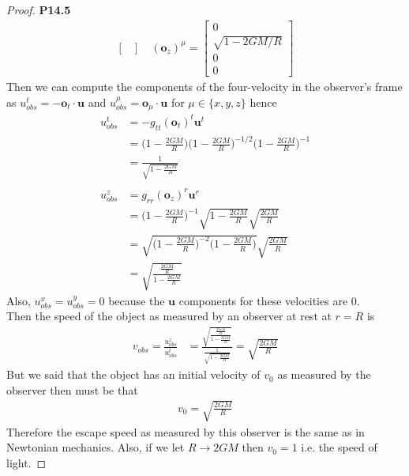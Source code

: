 \documentclass[11pt]{article}
\theoremstyle{definition}
\begin{document}
\begin{proof}{\textbf{P14.5}}
\begin{align*}
\begin{bmatrix}
    \end{bmatrix}
    \quad (\bm{o}_z)^\mu = \begin{bmatrix}
        0\\ \sqrt{1 - 2GM/R}\\ 0 \\ 0
    \end{bmatrix}
\end{align*}
Then we can compute the components of the four-velocity in the observer's frame
as $u_{obs}^t = -\bm{o}_t\cdot \bm{u}$ and $u_{obs}^\mu = \bm{o}_\mu\cdot \bm{u}$
for $\mu \in \{x, y, z\}$ hence
\begin{align*}
    u_{obs}^t &= -g_{tt}(\bm{o}_t)^t \bm{u}^t\\
    &= \bigg(1 - \frac{2GM}{R}\bigg)\bigg(1 - \frac{2GM}{R}\bigg)^{-1/2}
    \bigg(1 - \frac{2GM}{R}\bigg)^{-1}\\
    &= \frac{1}{\sqrt{1 - \frac{2GM}{R}}}\\
    \\
    u_{obs}^z &= g_{rr}(\bm{o}_z)^r \bm{u}^r\\
    &=\bigg(1 - \frac{2GM}{R}\bigg)^{-1}\sqrt{1 - \frac{2GM}{R}}
    \sqrt{\frac{2GM}{R}}\\
    &=\sqrt{\bigg(1 - \frac{2GM}{R}\bigg)^{-2}\bigg(1 - \frac{2GM}{R}\bigg)}
    \sqrt{\frac{2GM}{R}}\\
    &= \sqrt{\frac{\frac{2GM}{R}}{1 - \frac{2GM}{R}}}
\end{align*}
Also, $u_{obs}^x = u_{obs}^y = 0$ because the $\bm{u}$ components for these
velocities are 0.
\\
Then the speed of the object as measured by an observer at rest at $r = R$ is
\begin{align*}
    v_{obs} = \frac{u_{obs}^z}{u_{obs}^t} 
    &= \frac{\sqrt{\frac{\frac{2GM}{R}}{1 - \frac{2GM}{R}}}}
    {\frac{1}{\sqrt{1 - \frac{2GM}{R}}}}
    = \sqrt{\frac{2GM}{R}}
\end{align*}
But we said that the object has an initial velocity of $v_0$ as measured by
the observer then must be that
\begin{align*}
    v_0 = \sqrt{\frac{2GM}{R}}
\end{align*}
Therefore the escape speed as measured by this observer is the same as in
Newtonian mechanics.
Also, if we let $R \to 2GM$ then $v_0 = 1$ i.e. the speed of light. 
\end{proof}
\end{document}

